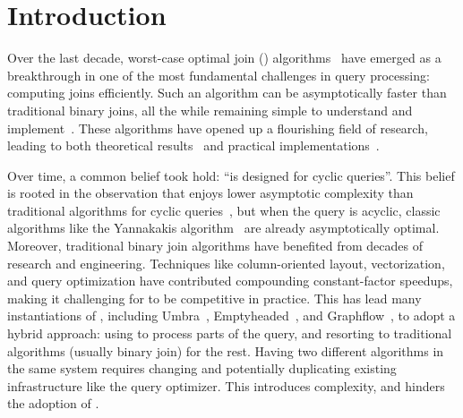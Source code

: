 \section{Introduction}\label{sec:intro}

Over the last decade, worst-case optimal join (\WCOJ)
algorithms~\cite{DBLP:conf/pods/NgoPRR12, DBLP:conf/icdt/Veldhuizen14,
  DBLP:journals/sigmod/NgoRR13, DBLP:conf/pods/000118} have emerged as
a breakthrough in one of the most fundamental challenges in query
processing: computing joins efficiently.  Such an algorithm can be
asymptotically faster than traditional binary joins, all the while
remaining simple to understand and
implement~\cite{DBLP:journals/sigmod/NgoRR13}.  These algorithms have
opened up a flourishing field of research, leading to both theoretical
results~\cite{DBLP:journals/sigmod/NgoRR13,DBLP:conf/pods/Khamis0S17}
and practical
implementations~\cite{DBLP:conf/icdt/Veldhuizen14,DBLP:journals/tods/AbergerLTNOR17,DBLP:journals/pvldb/FreitagBSKN20, DBLP:journals/pvldb/MhedhbiS19}.

Over time, a common belief took hold: 
  ``\WCOJ is designed for cyclic queries''.
This belief is rooted in the observation that 
  \WCOJ enjoys lower asymptotic complexity 
  than traditional algorithms for cyclic queries~\cite{DBLP:journals/sigmod/NgoRR13}, 
  but when the query is acyclic, 
  classic algorithms like the Yannakakis algorithm~\cite{DBLP:conf/vldb/Yannakakis81} 
  are already asymptotically optimal. 
Moreover, traditional binary join algorithms have benefited from 
  decades of research and engineering.
Techniques like column-oriented layout, vectorization, 
  and query optimization
  have contributed compounding constant-factor speedups,
  making it challenging for \WCOJ to be competitive in practice.
This has lead many instantiations of \WCOJ,
  including Umbra~\cite{DBLP:journals/pvldb/FreitagBSKN20},
   Emptyheaded~\cite{DBLP:journals/tods/AbergerLTNOR17}, and Graphflow~\cite{DBLP:journals/pvldb/MhedhbiS19},
  to adopt a hybrid approach: 
  using \WCOJ to process parts of the query,
  and resorting to traditional algorithms (usually binary join) 
  for the rest.
Having two different algorithms in the same system
  requires changing and potentially duplicating existing infrastructure 
  like the query optimizer. 
This introduces complexity, and hinders the adoption of \WCOJ.

